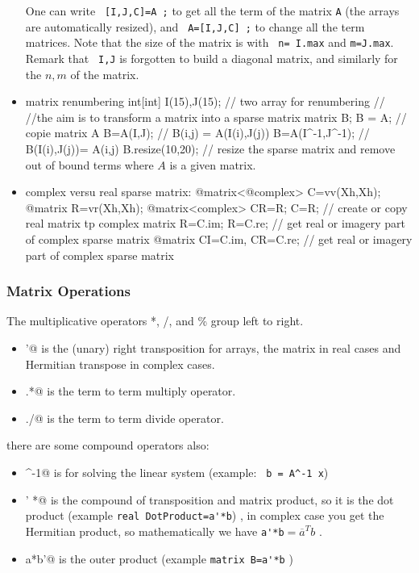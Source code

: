 \documentclass[a4paper,twoside,12pt]{book}
\def\setS#1{#1\label{sec:#1}}
\begin{document}
\begin{itemize}
  One can write
  \verb! [I,J,C]=A ;! to get all the term of the matrix \verb!A! (the arrays are automatically resized), and
   \verb! A=[I,J,C] ;! to change all the term matrices. Note that the size of
   the matrix is with \verb! n= I.max! and \verb!m=J.max!. Remark that  \verb! I,J! is forgotten to build a
   diagonal matrix, and similarly for the $n,m$ of the matrix.
\item matrix renumbering
\bFF
  int[int] I(15),J(15); // two array for renumbering
  //
//the aim is to transform a matrix into a sparse matrix
  matrix B;
  B = A; //  copie matrix A
  B=A(I,J); //  B(i,j) = A(I(i),J(j))
  B=A(I^-1,J^-1);  // B(I(i),J(j))= A(i,j)
  B.resize(10,20); //  resize the sparse matrix  and  remove out of bound terms
\eFF
where $A$ is a given matrix.
\item complex versu real sparse matrix:  
\bFF
  @matrix<@complex> C=vv(Xh,Xh);
  @matrix  R=vr(Xh,Xh);
  @matrix<complex> CR=R; C=R; // create or copy real matrix tp complex matrix 
  R=C.im; R=C.re; // get real or imagery part of complex sparse matrix 
  @matrix CI=C.im,  CR=C.re; // get real or imagery part of complex  sparse matrix 
\eFF
\end{itemize}

\subsubsection{\setS{Matrix Operations}}

The multiplicative operators *, /, and \% group left to right.

\begin{itemize}
\item  \verb@'@  is the (unary) right transposition for arrays, the matrix  in real cases
and Hermitian transpose in  complex cases.
 \item \verb@.*@ is the term to term multiply operator.   
 \item \verb@./@ is the term to term divide operator.   
\end{itemize}
there are some compound operators also:
\begin{itemize}
 \item \verb@^-1@ is for  solving the linear system (example: \verb$ b = A^-1 x$) 
 \item \verb@' *@ is the compound  of transposition and matrix product, so it is the dot product
(example \verb$real DotProduct=a'*b$) , in complex case you get the Hermitian
product, so mathematically we have  \verb!a'*b!$ =  \overline{a}^T b $ .
 \item \verb@ a*b'@ is the outer product  (example  \verb$matrix B=a'*b$ )
\end{itemize}
\end{document}
